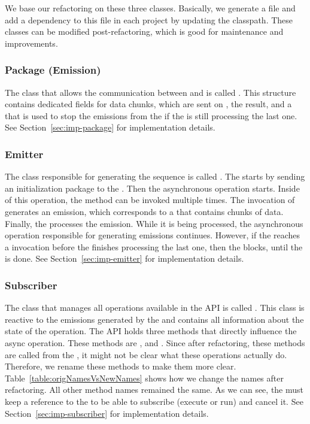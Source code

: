 \documentclass[type=bsc,accentcolor=tud9c]{tudthesis}
\begin{document}
We base our refactoring on these three classes. Basically, we generate a  file and add a dependency to this file in each project by updating the classpath. These classes can be modified post-refactoring, which is good for maintenance and improvements.

\subsubsection{Package (Emission)}
The class that allows the communication between  and  is called . This structure contains dedicated fields for data chunks, which are sent on , the result, and a  that is used to stop the emissions from the  if the  is still processing the last one. See Section~\ref{sec:imp-package} for implementation details.

\subsubsection{Emitter}
The class responsible for generating the sequence is called . The  starts by sending an initialization package to the . Then the asynchronous operation starts. Inside of this operation, the method  can be invoked multiple times. The invocation of  generates an emission, which corresponds to a  that contains chunks of data. Finally, the  processes the emission. While it is being processed, the asynchronous operation responsible for generating emissions continues. However, if the  reaches a  invocation before the  finishes processing the last one, then the  blocks, until the  is done. See Section~\ref{sec:imp-emitter}  for implementation details.

\subsubsection{Subscriber}
The class that manages all operations available in the  API is called . This class is reactive to the emissions generated by the  and contains all information about the state of the operation. The  API holds three methods that directly influence the async operation. These methods are ,  and . Since after refactoring, these methods are called from the , it might not be clear what these operations actually do. Therefore, we rename these methods to make them more clear. Table~\ref{table:origNamesVsNewNames} shows how we change the names after refactoring. All other method names remained the same. As we can see, the  must keep a reference to the  to be able to subscribe (execute or run) and cancel it. See Section~\ref{sec:imp-subscriber} for implementation details.
\end{document}
